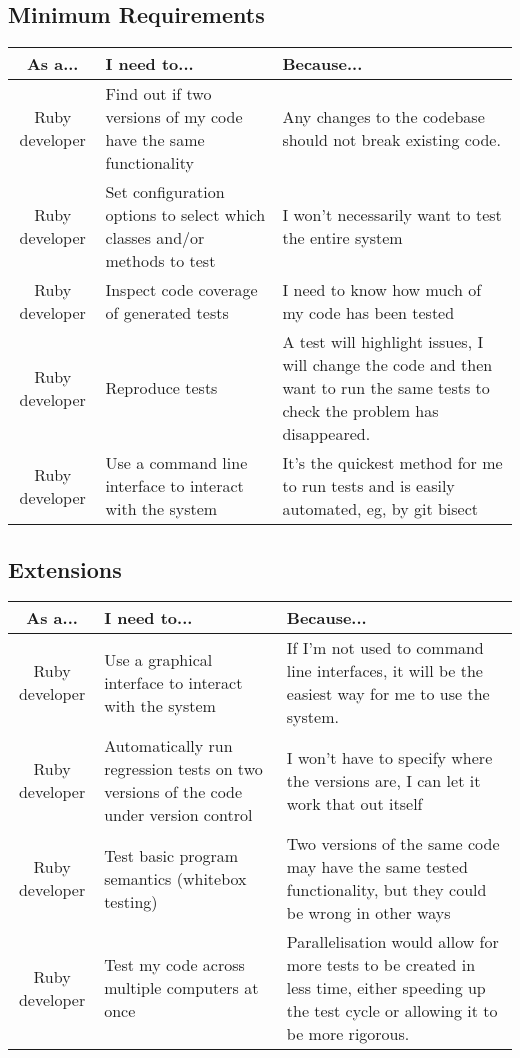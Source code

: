   \subsection{Minimum Requirements}
    \begin{tabular}{| c | p{\colwidth} | p{\colwidth} |}
    \hline
    \textbf{As a...} & \textbf{I need to...} & \textbf{Because...} \\
    \hline
    Ruby developer &
    Find out if two versions of my code have the same functionality &
    Any changes to the codebase should not break existing code. \\
    \hline
    Ruby developer &
    Set configuration options to select which classes and/or methods to test &
    I won't necessarily want to test the entire system \\
    \hline
    Ruby developer &
    Inspect code coverage of generated tests &
    I need to know how much of my code has been tested \\
    \hline
    Ruby developer &
    Reproduce tests &
    A test will highlight issues, I will change the code and then want to run the same tests to check the problem has disappeared. \\
    \hline
    Ruby developer &
    Use a command line interface to interact with the system &
    It's the quickest method for me to run tests and is easily automated, eg, by git bisect \\
    \hline
    \end{tabular}
  \subsection{Extensions}
    \begin{tabular}{| c | p{\colwidth} | p{\colwidth} |}
    \hline
    \textbf{As a...} & \textbf{I need to...} & \textbf{Because...} \\
    \hline
    Ruby developer &
    Use a graphical interface to interact with the system &
    If I'm not used to command line interfaces, it will be the easiest way for me to use the system. \\
    \hline
    Ruby developer &
    Automatically run regression tests on two versions of the code under version control &
    I won't have to specify where the versions are, I can let it work that out itself \\
    \hline
    Ruby developer &
    Test basic program semantics (whitebox testing) &
    Two versions of the same code may have the same tested functionality, but they could be wrong in other ways \\
    \hline
    Ruby developer &
    Test my code across multiple computers at once &
    Parallelisation would allow for more tests to be created in less time, either speeding up the test cycle or allowing it to be more rigorous. \\
    \hline
    \end{tabular}
